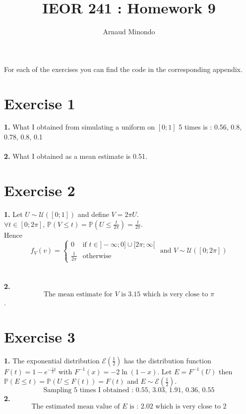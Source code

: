 \documentclass{article}
\title{IEOR 241 : Homework 9}
\author{Arnaud Minondo}
\begin{document}
\maketitle
For each of the exercises you can find the code in the corresponding appendix.
\section*{Exercise 1}
\textbf{1.} What I obtained from simulating a uniform on $[0;1]$ 5 times is : 0.56, 0.8, 0.78, 0.8, 0.1
\\\\
\textbf{2.} What I obtained as a mean estimate is 0.51.
\section*{Exercise 2}
\textbf{1.} Let $U \sim \mathcal{U}([0;1])$ and define $V = 2\pi U$.
\\
$\forall t \in [0;2\pi]$, $\mathbb{P}(V\leq t) = \mathbb{P}(U\leq \frac{t}{2\pi}) = \frac{t}{2\pi}$.
\\
Hence $$\boxed{f_V(v) = \left\{\begin{array}{ll}
    0 & \text{if } t\in]-\infty;0]\cup[2\pi;\infty[\\
    \frac{1}{2\pi} & \text{otherwise}
\end{array}\right. \text{ and } V\sim\mathcal{U}([0;2\pi])}$$
\\\\
\textbf{2.} $$\boxed{\text{The mean estimate for $V$ is 3.15 which is very close to $\pi$}}$$.
\section*{Exercise 3}
\textbf{1.} The exponential distribution $\mathcal{E}(\frac{1}{2})$ has the distribution function $F(t) = 1-e^{-\frac{1}{2}t}$ with $F^{-1}(x) = -2\ln(1-x)$.
Let $E = F^{-1}(U)$ then $\mathbb{P}(E\leq t) = \mathbb{P}(U\leq F(t)) = F(t)$ and $E\sim \mathcal{E}(\frac{1}{2})$. $$\boxed{\text{Sampling 5 times I obtained : 0.55, 3.03, 1.91, 0.36, 0.55}}$$
\textbf{2.} $$\boxed{\text{The estimated mean value of $E$ is : 2.02 which is very close to 2} }$$
\newpage
\end{document}
